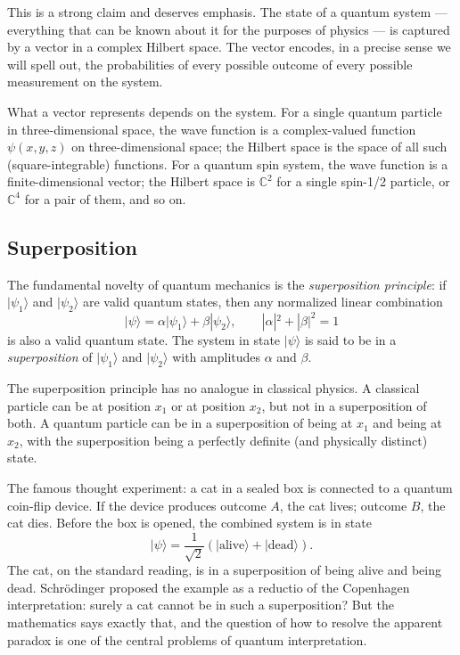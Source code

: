 This is a strong claim and deserves emphasis. The state of a
quantum system --- everything that can be known about it for the
purposes of physics --- is captured by a vector in a complex Hilbert
space. The vector encodes, in a precise sense we will spell out, the
probabilities of every possible outcome of every possible measurement
on the system.

What a vector represents depends on the system. For a single quantum
particle in three-dimensional space, the wave function is a complex-valued
function $\psi(x, y, z)$ on three-dimensional space; the Hilbert space
is the space of all such (square-integrable) functions. For a quantum
spin system, the wave function is a finite-dimensional vector; the
Hilbert space is $\mathbb{C}^2$ for a single spin-1/2 particle, or
$\mathbb{C}^4$ for a pair of them, and so on.

\subsection{Superposition}

The fundamental novelty of quantum mechanics is the
\emph{superposition principle}: if $|\psi_1\rangle$ and $|\psi_2\rangle$
are valid quantum states, then any normalized linear combination
\[
    |\psi\rangle = \alpha |\psi_1\rangle + \beta |\psi_2\rangle, \qquad
    |\alpha|^2 + |\beta|^2 = 1
\]
is also a valid quantum state. The system in state $|\psi\rangle$
is said to be in a \emph{superposition} of $|\psi_1\rangle$ and
$|\psi_2\rangle$ with amplitudes $\alpha$ and $\beta$.

The superposition principle has no analogue in classical physics. A
classical particle can be at position $x_1$ or at position $x_2$,
but not in a superposition of both. A quantum particle can be in a
superposition of being at $x_1$ and being at $x_2$, with the
superposition being a perfectly definite (and physically distinct)
state.

\begin{example}
The famous thought experiment: a cat in a sealed box is connected to
a quantum coin-flip device. If the device produces outcome $A$, the
cat lives; outcome $B$, the cat dies. Before the box is opened, the
combined system is in state
\[
    |\psi\rangle = \frac{1}{\sqrt{2}} \left( |\text{alive}\rangle +
    |\text{dead}\rangle \right).
\]
The cat, on the standard reading, is in a superposition of being
alive and being dead. Schr\"odinger proposed the example as a
reductio of the Copenhagen interpretation: surely a cat cannot be
in such a superposition? But the mathematics says exactly that, and
the question of how to resolve the apparent paradox is one of the
central problems of quantum interpretation.
\end{example}

